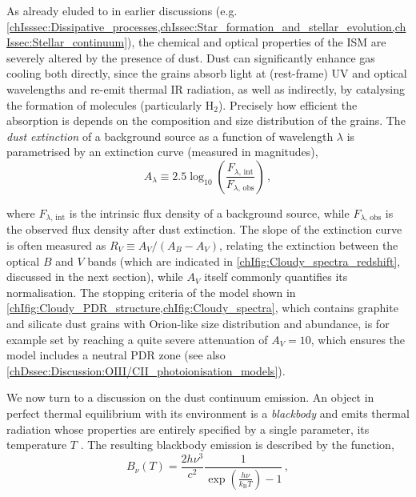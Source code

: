 As already eluded to in earlier discussions (e.g. \cref{chIsssec:Dissipative_processes,chIssec:Star_formation_and_stellar_evolution,chIssec:Stellar_continuum}), the chemical and optical properties of the ISM are severely altered by the presence of dust. Dust can significantly enhance gas cooling both directly, since the grains absorb light at (rest-frame) UV and optical wavelengths and re-emit thermal IR radiation, as well as indirectly, by catalysing the formation of molecules (particularly $\mathrm{H_2}$). Precisely how efficient the absorption is depends on the composition and size distribution of the grains. The \textit{dust extinction} of a background source as a function of wavelength $\lambda$ is parametrised by an extinction curve (measured in magnitudes),
\begin{equation}
    \label{chIeq:Dust_extinction}
    A_\lambda \equiv 2.5 \log_{10} \left( \frac{F_{\lambda, \, \text{int}}}{F_{\lambda, \, \text{obs}}} \right) \, ,
\end{equation}

\noindent where $F_{\lambda, \, \text{int}}$ is the intrinsic flux density of a background source, while $F_{\lambda, \, \text{obs}}$ is the observed flux density after dust extinction. The slope of the extinction curve is often measured as $R_V \equiv A_V/(A_B - A_V)$, relating the extinction between the optical $B$ and $V$ bands (which are indicated in \cref{chIfig:Cloudy_spectra_redshift}, discussed in the next section), while $A_V$ itself commonly quantifies its normalisation. The stopping criteria of the  model shown in \cref{chIfig:Cloudy_PDR_structure,chIfig:Cloudy_spectra}, which contains graphite and silicate dust grains with Orion-like size distribution and abundance, is for example set by reaching a quite severe attenuation of $A_V = 10$, which ensures the model includes a neutral PDR zone (see also \cref{chDssec:Discussion:OIII/CII_photoionisation_models}).

We now turn to a discussion on the dust continuum emission. An object in perfect thermal equilibrium with its environment is a \textit{blackbody} and emits thermal radiation whose properties are entirely specified by a single parameter, its temperature $T$ \citep{1901AnP...309..553P}. The resulting blackbody emission is described by the \citeauthor{1901AnP...309..553P} function,
\begin{equation}
    \label{chIeq:Planck_function}
    B_\nu (T) = \frac{2 h \nu^3}{c^2} \frac{1}{\exp \left( \frac{h \nu}{k_\text{B} T} \right) - 1} \, ,
\end{equation}

